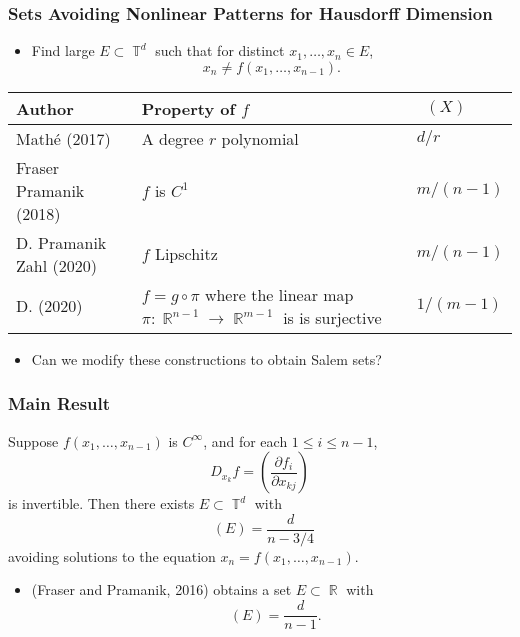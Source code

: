 \documentclass[usenames,dvipsnames]{beamer}
\DeclareMathOperator{\RR}{\mathbb{R}}
\DeclareMathOperator{\TT}{\mathbb{T}}
\DeclareMathOperator{\fordim}{\text{dim}_{\mathbb{F}}}
\DeclareMathOperator{\hausdim}{\text{dim}_{\mathbb{H}}}
\begin{document}
\begin{frame}
    \frametitle{Sets Avoiding Nonlinear Patterns for Hausdorff Dimension}

    \begin{itemize}
        \pause
        \item Find large $E \subset \TT^d$ such that for distinct $x_1,\dots,x_n \in E$,
        \[ x_n \neq f(x_1,\dots,x_{n-1}). \]
    \end{itemize}

    \pause
    \begin{center}
    \begin{tabular}{| p{4cm} | p{4cm} | p{1.6cm} |}
        \hline
        \textbf{Author} & \textbf{Property of $f$} & $\hausdim(X)$\\
        \hline
        Math\'{e} (2017) & A degree $r$ polynomial & $d/r$\\
        \hline
        Fraser Pramanik (2018) & $f$ is $C^1$ & $m/(n-1)$\\
        \hline
        D. Pramanik Zahl (2020) & $f$ Lipschitz & $m/(n-1)$\\
        \hline
        D. (2020) & $f = g \circ \pi$ where the linear map $\pi: \RR^{n-1} \to \RR^{m-1}$ is is surjective & $1/(m-1)$\\
        \hline
    \end{tabular}
    \end{center}

    \begin{itemize}
        \item Can we modify these constructions to obtain Salem sets?
    \end{itemize}
\end{frame}







\begin{frame}
    \frametitle{Main Result}

    \begin{theorem}
        Suppose $f(x_1,\dots,x_{n-1})$ is $C^\infty$, and for each $1 \leq i \leq n-1$,
        \[ D_{x_k} f = \left( \frac{\partial f_i}{\partial x_{kj}} \right) \]
        is invertible. Then there exists $E \subset \TT^d$ with
        \[ \fordim(E) = \frac{d}{n - 3/4} \]
        avoiding solutions to the equation $x_n = f(x_1,\dots,x_{n-1})$.
    \end{theorem}

    \begin{itemize}
        \item (Fraser and Pramanik, 2016) obtains a set $E \subset \RR$ with
        \[ \hausdim(E) = \frac{d}{n - 1}. \]
    \end{itemize}
\end{frame}
\end{document}
